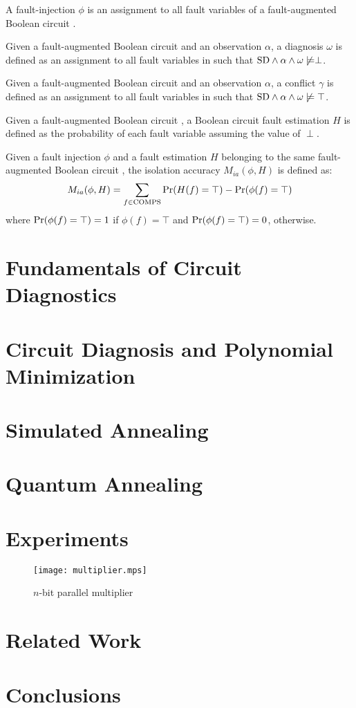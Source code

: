 \documentclass{article}
\begin{document}
\begin{definition}
  A fault-injection $\phi$ is an assignment to all fault variables of
  a fault-augmented Boolean circuit \sd.
\end{definition}

\begin{definition}[Diagnosis]
  Given a fault-augmented Boolean circuit \sd and an observation
  $\alpha$, a diagnosis $\omega$ is defined as an assignment to all
  fault variables in \sd such that $\mathrm{SD} \wedge \alpha \wedge \omega
  \not\models \perp$.
\end{definition}

\begin{definition}[Conflict]
  Given a fault-augmented Boolean circuit \sd and an observation
  $\alpha$, a conflict $\gamma$ is defined as an assignment to all
  fault variables in \sd such that $\mathrm{SD} \wedge \alpha \wedge \omega
  \not\models \top$.
\end{definition}

\begin{definition}
  Given a fault-augmented Boolean circuit \sd, a Boolean circuit
  fault estimation $H$ is defined as the probability of each fault
  variable assuming the value of $\perp$.
\end{definition}

\begin{definition}
  Given a fault injection $\phi$ and a fault estimation $H$ belonging
  to the same fault-augmented Boolean circuit \sd, the isolation
  accuracy $M_{ia}(\phi, H)$ is defined as:
  \begin{eqnarray}
    M_{ia}(\phi, H) = \sum_{f \in \mathrm{COMPS}}{\mbox{Pr}(H(f) = \top) - \mbox{Pr}(\phi(f) = \top)}
  \end{eqnarray}
  where $\mbox{Pr}(\phi(f) = \top) = 1$ if $\phi(f) = \top$ and
  $\mbox{Pr}(\phi(f) = \top) = 0$, otherwise.
\end{definition}
%
\section{Fundamentals of Circuit Diagnostics}
\section{Circuit Diagnosis and Polynomial Minimization}
\section{Simulated Annealing}
\section{Quantum Annealing}
\section{Experiments}
%
\begin{figure}[htb]
\centering
\texttt{[image: multiplier.mps]}
\caption{$n$-bit parallel multiplier\label{fig:multiplier}}
\end{figure}
%
\section{Related Work}
\section{Conclusions}
\end{document}
